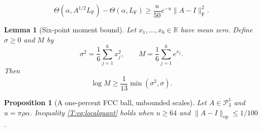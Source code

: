 \documentclass[10pt,a4paper]{amsart}
\newtheorem{lemma}{Lemma}
\newtheorem{proposition}{Proposition}
\newcommand{\FCC}{L_{\mathrm F}}
\newcommand{\Id}{I}
\newcommand{\PP}{\mathcal P_3^1}
\newcommand{\R}{{\mathbb R}}
\newcommand{\Th}{\Theta}
\newcommand{\frob}{\mathrm F}
\newcommand{\op}{\mathrm{op}}
\begin{document}
\begin{equation}\label{T:eq:localquant}
 \Th(\alpha,A^{1/2}\FCC)-\Th(\alpha,\FCC)
 \ge\frac{u}{50}e^{-u}\|A-\Id\|_{\frob}^2.
\end{equation}

\begin{lemma}[Six-point moment bound]\label{T:lem:mgf}
Let $x_1,\ldots,x_6\in\R$ have mean zero. Define $\sigma\ge0$ and $M$ by
\[
 \sigma^2=\frac16\sum_{j=1}^6x_j^2,
 \qquad M=\frac16\sum_{j=1}^6e^{x_j}.
\]
Then
\begin{equation}\label{T:eq:mgf}
 \log M\ge\frac1{13}\min(\sigma^2,\sigma).
\end{equation}
\end{lemma}

\begin{proposition}[A one-percent FCC ball, unbounded scales]\label{T:prop:smallballlarge}
Let $A\in\PP$ and $u=\pi\rho\alpha$. Inequality \eqref{T:eq:localquant} holds when $u\ge64$ and $\|A-\Id\|_{\op}\le1/100$.
\end{proposition}
\end{document}
